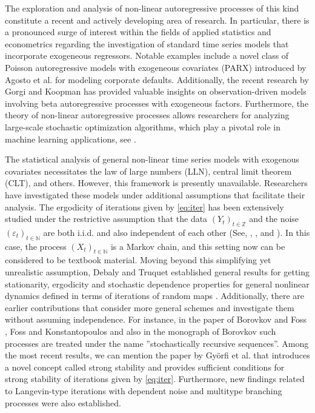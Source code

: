 \documentclass[a4paper,10pt]{article}
\newcommand{\N}{\mathbb{N}}
\newcommand{\Z}{\mathbb{Z}}
\newcommand{\eps}{\varepsilon}
\begin{document}
The exploration and analysis of non-linear autoregressive processes of this kind constitute a recent and actively developing area of research. In particular, there is a pronounced surge of interest within the fields of applied statistics and econometrics regarding the investigation of standard time series models that incorporate exogeneous regressors. Notable examples include a novel class of Poisson autoregressive models with exogeneous covariates (PARX) introduced by Agosto et al. \cite{PARX_AGOSTO2016640} for modeling corporate defaults. Additionally, the recent research by Gorgi and Koopman \cite{Gorgi2020} has provided valuable insights on observation-driven models involving beta autoregressive processes with exogeneous factors. 
Furthermore, the theory of non-linear autoregressive processes allows researchers for analyzing
large-scale stochastic optimization algorithms, which play a pivotal role in machine learning applications, see \cite{largescaleML2018,lovas}.

\smallskip
The statistical analysis of general non-linear time series models with exogenous covariates  necessitates the law of large numbers (LLN), central limit theorem (CLT), and others. However, this framework is presently unavailable. Researchers have investigated these models under additional assumptions that facilitate their analysis. The ergodicity of iterations given by \eqref{eq:iter} has been extensively studied under the restrictive assumption that the data $(Y_t)_{t\in\Z}$ and the noise $(\eps_t)_{t\in\N}$ are both i.i.d. and also independent of each other (See, \cite{DiFr99}, \cite{Ios09}, and \cite{stenflo}). In this case, the process $(X_t)_{t\in\N}$ is a Markov chain, and this setting now can be considered to be textbook material. Moving beyond this simplifying yet unrealistic assumption, Debaly and Truquet established general results for getting stationarity, ergodicity and stochastic dependence properties for general nonlinear dynamics defined in terms of iterations of random maps \cite{debaly_truquet_2021}. Additionally, there are earlier contributions that consider more general schemes and investigate them without assuming independence. For instance, in the paper of Borovkov and Foss \cite{borovkov1993stochastically}, Foss and Konstantopoulos \cite{foss2003extended} and also in the monograph of Borovkov \cite{borovkov} such processes are treated under the name ''stochastically recursive sequences''. Among the most recent results, we can mention the paper \cite{gyrfi2023strong} by Gy\"orfi et al. that introduces a novel concept called strong stability and provides sufficient conditions for strong stability of iterations given by \eqref{eq:iter}. Furthermore, new findings related to Langevin-type iterations with dependent noise and multitype branching processes were also established.
\end{document}
